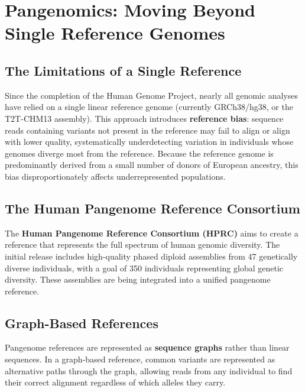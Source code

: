 \section{Pangenomics: Moving Beyond Single Reference Genomes}
\label{sec:emerging:pangenomics}

\subsection{The Limitations of a Single Reference}
\label{subsec:emerging:reference-bias}

Since the completion of the Human Genome Project, nearly all genomic analyses have relied on a single linear reference genome (currently GRCh38/hg38, or the T2T-CHM13 assembly). This approach introduces \textbf{reference bias}: sequence reads containing variants not present in the reference may fail to align or align with lower quality, systematically underdetecting variation in individuals whose genomes diverge most from the reference. Because the reference genome is predominantly derived from a small number of donors of European ancestry, this bias disproportionately affects underrepresented populations.

\subsection{The Human Pangenome Reference Consortium}
\label{subsec:emerging:hprc}

The \textbf{Human Pangenome Reference Consortium (HPRC)} aims to create a reference that represents the full spectrum of human genomic diversity. The initial release includes high-quality phased diploid assemblies from 47 genetically diverse individuals, with a goal of 350 individuals representing global genetic diversity. These assemblies are being integrated into a unified pangenome reference.

\subsection{Graph-Based References}
\label{subsec:emerging:graph-references}

Pangenome references are represented as \textbf{sequence graphs} rather than linear sequences. In a graph-based reference, common variants are represented as alternative paths through the graph, allowing reads from any individual to find their correct alignment regardless of which alleles they carry.

